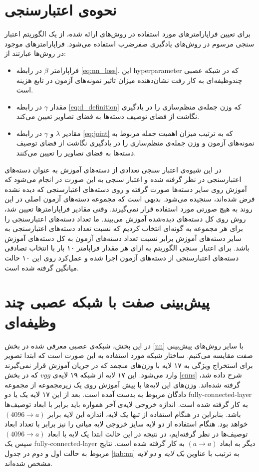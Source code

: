 \section{نحوه‌ی اعتبارسنجی}\label{exp:validation}
برای تعیین فراپارامترهای مورد استفاده در روش‌های ارائه شده،  از یک الگوریتم اعتبار سنجی مرسوم در روش‌های یادگیری صفرضرب استفاده می‌شود.
فراپارامترهای موجود در روش‌ها عبارتند از:
\begin{itemize}
\item
 فراپارامتر $\beta$ در رابطه \eqref{eq:nn_loss}. این \gls{hyperparameter} که در شبکه عصبی چندوظیفه‌ای به کار رفت نشان‌دهنده میزان تاثیر نمونه‌های آزمون در تابع هزینه است.
\item
مقدار $\gamma$ در رابطه \eqref{eq:d_definition} که وزن جمله‌ی منظم‌سازی را در یادگیری نگاشت از فضای توصیف دسته‌ها به فضای تصاویر تعیین می‌کند.
\item
مقادیر  $\lambda$ و $\gamma$ در رابطه \eqref{eq:joint} که به ترتیب میزان اهمیت جمله مربوط به نمونه‌های آزمون و وزن جمله‌ی منظم‌سازی را در یادگیری نگاشت از فضای توصیف دسته‌ها به فضای تصاویر را تعیین می‌کنند.
\end{itemize}
در این شیوه‌ی اعتبار سنجی تعدادی از دسته‌های آموزش به عنوان دسته‌های اعتبارسنجی در نظر گرفته شده و اعتبار سنجی به این صورت در انجام می‌شود که آموزش روی سایر دسته‌ها صورت گرفته و روی دسته‌های اعتبارسنجی که دیده نشده فرض شده‌اند، سنجیده می‌شود. بدیهی است که مجموعه‌ دسته‌های آزمون اصلی در این روند به هیچ صورتی مورد استفاده قرار نمی‌گیرند. وقتی مقادیر فراپارامترها تعیین شد، روش روی کل دسته‌های دیده‌شده آموزش می‌بیند. ما تعداد دسته‌های اعتبارسنجی را برای هر مجموعه به گونه‌ای انتخاب کردیم که نسبت تعداد دسته‌های اعتبارسنجی به سایر دسته‌های آموزش برابر نسبت تعداد دسته‌های آزمون به کل دسته‌های آموزش باشد. برای اعتبار سنجی الگوریتم به ازای هر مقدار فراپامتر ۱۰ بار با انتخاب تصادفی دسته‌های اعتبارسنجی از دسته‌های آزمون اجرا شده و عمل‌کرد روی این ۱۰ حالت میانگین گرفته شده است.
%
\section{پیش‌بینی صفت با شبکه عصبی چند وظیفه‌ای} \label{exp:nn}

در این بخش، شبکه‌ی عصبی معرفی شده در بخش \ref{nn} با سایر روش‌های پیش‌بینی صفت مقایسه می‌کنیم.
ساختار شبکه مورد استفاده به این صورت است که ابتدا تصویر برای استخراج ویژگی به ۱۷ لایه با وزن‌های منجمد که در جریان آموزش قرار نمی‌گیرند وارد می‌شود. این ۱۷ لایه از شبکه ۱۹ لایه‌ی $vgg$ که در بخش
\ref{cnns}
شرح داده شد، گرفته شده‌اند. وزن‌های این لایه‌ها با پیش آموزش روی یک زیرمجموعه از مجموعه دادگان  مربوط به  بدست آمده است.
بعد از این ۱۷ لایه یک یا دو \gls{fully-connected-layer} به کار گرفته شده است. اندازه خروجی لایه‌ی آخر همواره باید برابر با ابعاد توصیف‌ها باشد. بنابراین در هنگام استفاده از تنها یک لایه، اندازه این لایه برابر
$(4096 \rightarrow a)$
خواهد بود. هنگام استفاده از دو لایه سایز خروجی لایه میانی را نیز برابر با تعداد ابعاد توصیف‌ها در نظر گرفته‌ایم، در نتیجه در این حالت ابتدا یک لایه با ابعاد
$(4096 \rightarrow a)$
سپس یک \gls{fully-connected-layer} دیگر به ابعاد
$(a \rightarrow a)$
به کار گرفته شده است. نتایج مربوط به حالت اول و دوم  در جدول \ref{tab:nn} به ترتیب با عناوین
\textit{ یک لایه}
و
\textit{ دو لایه}
مشخص شده‌اند.

